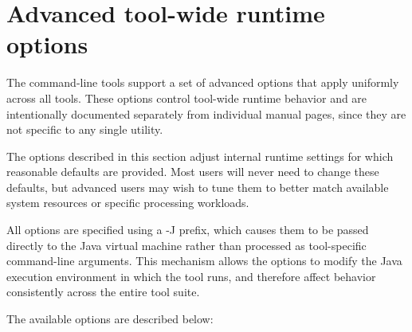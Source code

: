 \section{Advanced tool-wide runtime options}
\label{runtime}

The command-line tools support a set of advanced options that apply uniformly
across all tools. These options control tool-wide runtime behavior and are
intentionally documented separately from individual manual pages, since they
are not specific to any single utility.

The options described in this section adjust internal runtime settings for which
reasonable defaults are provided. Most users will never need to change these
defaults, but advanced users may wish to tune them to better match available
system resources or specific processing workloads.

All options are specified using a {\file -J} prefix, which causes them to be
passed directly to the Java virtual machine rather than processed as
tool-specific command-line arguments. This mechanism allows the options to
modify the Java execution environment in which the tool runs, and therefore
affect behavior consistently across the entire tool suite.

The available options are described below:

